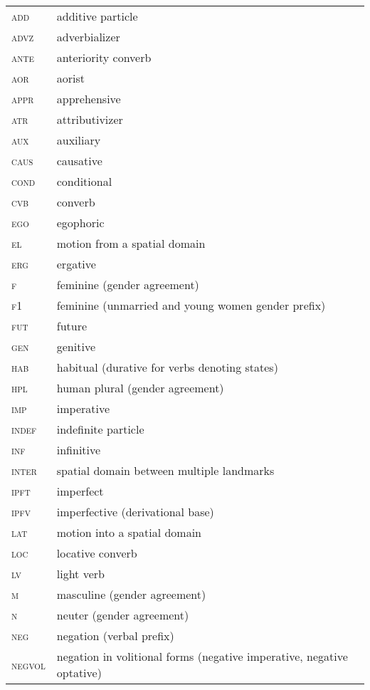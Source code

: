 \documentclass[output=paper]{langsci/langscibook}
\begin{document}
\begin{longtable}[l]{@{}ll@{}}
\textsc{add}	& additive particle \\
\textsc{advz}	& adverbializer \\
\textsc{ante}	& anteriority converb \\
\textsc{aor}	& aorist \\
\textsc{appr}	& apprehensive \\
\textsc{atr}	& attributivizer \\
\textsc{aux}	& auxiliary \\
\textsc{caus}	& causative \\
\textsc{cond}	& conditional \\
\textsc{cvb}	& converb \\
\textsc{ego}	& egophoric \\
\textsc{el}	& motion from a spatial domain \\
\textsc{erg}	& ergative \\
\textsc{f}	& feminine (gender agreement) \\
\textsc{f1}	& feminine (unmarried and young women gender prefix) \\
\textsc{fut}	& future \\
\textsc{gen}	& genitive \\
\textsc{hab}	& habitual (durative for verbs denoting states) \\
\textsc{hpl}	& human plural (gender agreement) \\
\textsc{imp}	& imperative \\
\textsc{indef}	& indefinite particle \\
\textsc{inf}	& infinitive \\
\textsc{inter}	& spatial domain between multiple landmarks \\
\textsc{ipft}	& imperfect \\
\textsc{ipfv}	& imperfective (derivational base) \\
\textsc{lat}	& motion into a spatial domain \\
\textsc{loc}	& locative converb \\
\textsc{lv}	& light verb \\
\textsc{m}	& masculine (gender agreement) \\
\textsc{n}	& neuter (gender agreement) \\
\textsc{neg}	& negation (verbal prefix) \\
\textsc{negvol}	& negation in volitional forms (negative imperative, negative optative) \\

\end{longtable}
\end{document}
